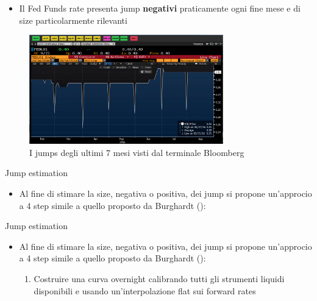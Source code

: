 \begin{tframe}
\begin{itemize}
\item Il Fed Funds rate presenta jump {\bfseries negativi} praticamente ogni fine mese e di size particolarmente rilevanti
\end{itemize}
\begin{figure}[!h]
\centering
\includegraphics[width=0.75\textwidth]{bloombergusd.png}
\caption{I jumps degli ultimi 7 mesi visti dal terminale Bloomberg}
\label{fig:bloombergusd}
\end{figure}
\end{tframe}
\begin{tframe}{Jump estimation}
\begin{itemize}
\item Al fine di stimare la size, negativa o positiva, dei jump si propone un'approcio a 4 step simile a quello proposto da Burghardt (\cite{burgh}):
\end{itemize}
\end{tframe}
\begin{tframe}{Jump estimation}
\begin{itemize}
\item Al fine di stimare la size, negativa o positiva, dei jump si propone un'approcio a 4 step simile a quello proposto da Burghardt (\cite{burgh}):
   \begin{enumerate}
   \item Costruire una curva overnight calibrando tutti gli strumenti liquidi disponibili e usando un'interpolazione flat sui forward rates
   \end{enumerate}
\end{itemize}
\end{tframe}
